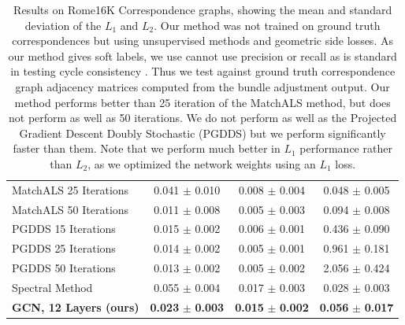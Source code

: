 \documentclass[10pt,twocolumn,letterpaper]{article}
\begin{document}
\begin{table}
\begin{center}
\begin{tabular}{|l|c|c|c|}
MatchALS \cite{zhou2015multi} 25 Iterations                              & 0.041 $\pm$ 0.010                   & 0.008 $\pm$ 0.004                   & 0.048 $\pm$ 0.005                   \\
MatchALS \cite{zhou2015multi} 50 Iterations                              & 0.011 $\pm$ 0.008                   & 0.005 $\pm$ 0.003                   & 0.094 $\pm$ 0.008                   \\ \hline
PGDDS \cite{leonardos2016distributed} 15 Iterations                      & 0.015 $\pm$ 0.002                   & 0.006 $\pm$ 0.001                   & 0.436 $\pm$ 0.090                   \\
PGDDS \cite{leonardos2016distributed} 25 Iterations                      & 0.014 $\pm$ 0.002                   & 0.005 $\pm$ 0.001                   & 0.961 $\pm$ 0.181                   \\
PGDDS \cite{leonardos2016distributed} 50 Iterations                      & 0.013 $\pm$ 0.002                   & 0.005 $\pm$ 0.002                   & 2.056 $\pm$ 0.424                   \\ \hline
Spectral Method                                                          & 0.055 $\pm$ 0.004                   & 0.017 $\pm$ 0.003                   & 0.028 $\pm$ 0.003                   \\ \hline
\textbf{GCN, 12 Layers (ours)}                                           & \textbf{0.023} $\pm$ \textbf{0.003} & \textbf{0.015} $\pm$ \textbf{0.002} & \textbf{0.056} $\pm$ \textbf{0.017} \\ \hline
\end{tabular}
\end{center}


\caption{
Results on Rome16K Correspondence graphs, showing the mean and standard deviation of the $L_1$ and $L_2$.
Our method was not trained on ground truth correspondences but using unsupervised methods and geometric side losses.
As our method gives soft labels, we use cannot use precision or recall as is standard in testing cycle consistency \cite{zhou2015multi}.
Thus we test against ground truth correspondence graph adjacency matrices computed from the bundle adjustment output.
Our method performs better than 25 iteration of the MatchALS \cite{zhou2015multi} method, but does not perform as well as 50 iterations.
We do not perform as well as the Projected Gradient Descent Doubly Stochastic (PGDDS) \cite{leonardos2016distributed} but we perform significantly faster than them.
Note that we perform much better in $L_1$ performance rather than $L_2$, as we optimized the network weights using an $L_1$ loss.
}
\end{table}
\end{document}
